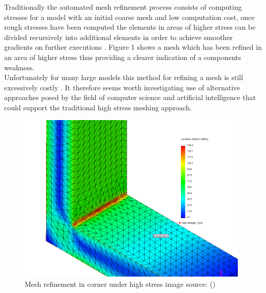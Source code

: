 \noindent
Traditionally the automated mesh refinement process consists of computing stresses for a model with an initial coarse mesh and low computation cost, once rough stresses have been computed the elements in areas of higher stress can be divided recursively into additional elements in order to achieve smoother gradients on further executions \cite{cite03}. Figure 1 shows a mesh which has been refined in an area of higher stress thus providing a clearer indication of a components weakness. \\ 

\noindent
Unfortunately for many large models this method for refining a mesh is still excessively costly \cite{DolsakPaper91}. It therefore seems worth investigating use of alternative approaches posed by the field of computer science and artificial intelligence that could support the traditional high stress meshing approach. 

\begin{figure}
  \centerline{\includegraphics[width=110mm, scale=0.5]{../Graphics/stressedCorner.png}}
  \caption{Mesh refinement in corner under high stress image source: (\cite{HighStressCorner})}
  \label{fig:boat1}
\end{figure}